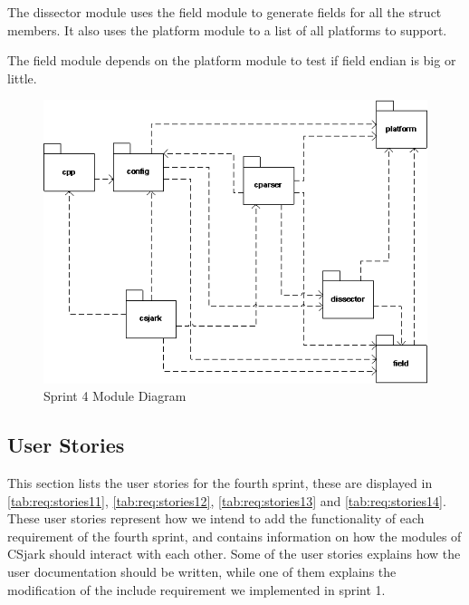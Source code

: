 The dissector module uses the field module to generate fields for all the 
struct members. It also uses the platform module to a list of all platforms
to support.

The field module depends on the platform module to test if field endian is big
or little.

\begin{figure}[htbp]
	\center
	\includegraphics[width=\textwidth]{./sprints/img/sp4modulediagram}
	\caption{Sprint 4 Module Diagram \label{fig:sp4module}}
\end{figure}

\subsection{User Stories}
\label{sec:req:stories4}
This section lists the user stories for the fourth sprint, these are displayed in \autoref{tab:req:stories11}, \autoref{tab:req:stories12}, \autoref{tab:req:stories13} and \autoref{tab:req:stories14}.
These user stories represent how we intend to add the functionality of each requirement of the fourth sprint,
and contains information on how the modules of CSjark should interact with each other.
Some of the user stories explains how the user documentation should be written, while one of them explains the modification of the \gls{include} requirement we implemented in sprint 1.

